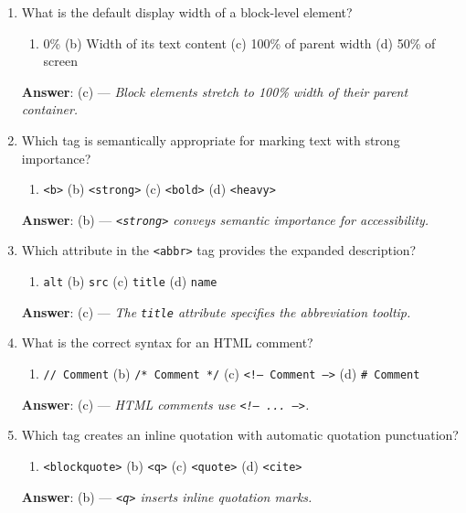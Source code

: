 \begin{enumerate}[leftmargin=1.5em]
    \item What is the default display width of a block-level element?
    \begin{enumerate}[label=(\alph*)]
        \item 0\% \quad (b) Width of its text content \quad (c) 100\% of parent width \quad (d) 50\% of screen
    \end{enumerate}
    \textbf{Answer}: (c) --- \textit{Block elements stretch to 100\% width of their parent container.}

    \item Which tag is semantically appropriate for marking text with strong importance?
    \begin{enumerate}[label=(\alph*)]
        \item \texttt{<b>} \quad (b) \texttt{<strong>} \quad (c) \texttt{<bold>} \quad (d) \texttt{<heavy>}
    \end{enumerate}
    \textbf{Answer}: (b) --- \textit{\texttt{<strong>} conveys semantic importance for accessibility.}

    \item Which attribute in the \texttt{<abbr>} tag provides the expanded description?
    \begin{enumerate}[label=(\alph*)]
        \item \texttt{alt} \quad (b) \texttt{src} \quad (c) \texttt{title} \quad (d) \texttt{name}
    \end{enumerate}
    \textbf{Answer}: (c) --- \textit{The \texttt{title} attribute specifies the abbreviation tooltip.}

    \item What is the correct syntax for an HTML comment?
    \begin{enumerate}[label=(\alph*)]
        \item \texttt{// Comment} \quad (b) \texttt{/* Comment */} \quad (c) \texttt{<!-- Comment -->} \quad (d) \texttt{\# Comment}
    \end{enumerate}
    \textbf{Answer}: (c) --- \textit{HTML comments use \texttt{<!-- ... -->}.}

    \item Which tag creates an inline quotation with automatic quotation punctuation?
    \begin{enumerate}[label=(\alph*)]
        \item \texttt{<blockquote>} \quad (b) \texttt{<q>} \quad (c) \texttt{<quote>} \quad (d) \texttt{<cite>}
    \end{enumerate}
    \textbf{Answer}: (b) --- \textit{\texttt{<q>} inserts inline quotation marks.}
\end{enumerate}

